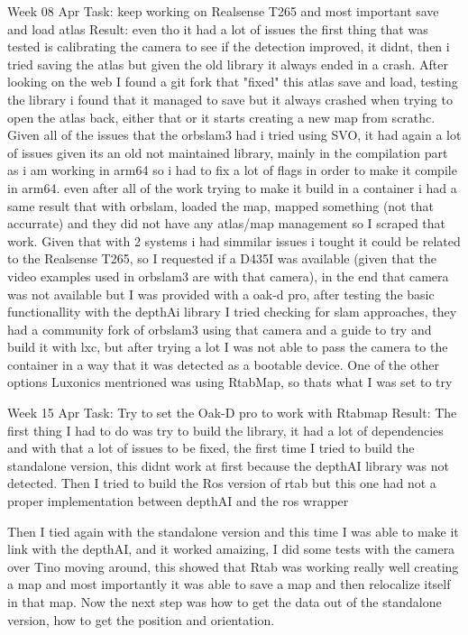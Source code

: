 Week 08 Apr
Task: keep working on Realsense T265 and most important save and load atlas
Result: even tho it had a lot of issues the first thing that was tested is calibrating the camera to see if the detection improved, it didnt, then i tried saving the atlas but given the old library it always ended in a crash. After looking on the web I found a git fork that "fixed" this atlas save and load, testing the library i found that it managed to save but it always crashed when trying to open the atlas back, either that or it starts creating a new map from scrathc. 
Given all of the issues that the orbslam3 had i tried using SVO, it had again a lot of issues given its an old not maintained library, mainly in the compilation part as i am working in arm64 so i had to fix a lot of flags in order to make it compile in arm64. even after all of the work trying to make it build in a container i had a same result that with orbslam, loaded the map, mapped something (not that accurrate) and they did not have any atlas/map management so I scraped that work.
Given that with 2 systems i had simmilar issues i tought it could be related to the Realsense T265, so I requested if a D435I was available (given that the video examples used in orbslam3 are with that camera), in the end that camera was not available but I was provided with a oak-d pro, after testing the basic functionallity with the depthAi library I tried checking for slam approaches, they had a community fork of orbslam3 using that camera and a guide to try and build it with lxc, but after trying a lot I was not able to pass the camera to the container in a way that it was detected as a bootable device. One of the other options Luxonics mentrioned was using RtabMap, so thats what I was set to try 

Week 15 Apr
Task: Try to set the Oak-D pro to work with Rtabmap
Result: The first thing I had to do was try to build the library, it had a lot of dependencies and with that a lot of issues to be fixed, the first time I tried to build the standalone version, this didnt work at first because the depthAI library was not detected.
Then I tried to build the Ros version of rtab but this one had not a proper implementation between depthAI and the ros wrapper

Then I tied again with the standalone version and this time I was able to make it link with the depthAI, and it worked amaizing, I did some tests with the camera over Tino moving around, this showed that Rtab was working really well creating a map and most importantly it was able to save a map and then relocalize itself in that map.
Now the next step was how to get the data out of the standalone version, how to get the position and orientation.

